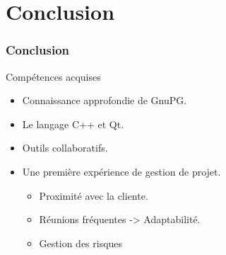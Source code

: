 \section{Conclusion}
\begin{frame}
  \frametitle{\color{white}Conclusion}
  \begin{block}{Compétences acquises}
      \begin{itemize}
        \item Connaissance approfondie de GnuPG.
        \item Le langage C++ et Qt.
        \item Outils collaboratifs.
        \item Une première expérience de gestion de projet.
        \begin{itemize}
	        \item Proximité avec la cliente.
	        \item Réunions fréquentes -> Adaptabilité.
	        \item Gestion des risques    	
      	\end{itemize}
      \end{itemize}
    \end{block}
\end{frame}
        
